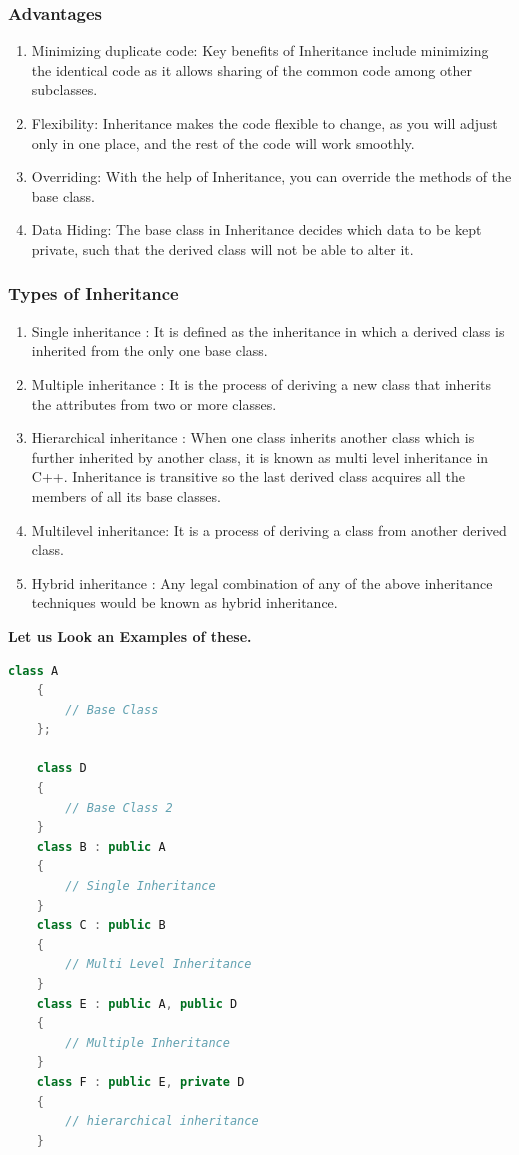 \documentclass[11pt]{article}
\begin{document}
\subsubsection{Advantages}
\begin{enumerate}
	\item Minimizing duplicate code: Key benefits of Inheritance include minimizing the identical code as it allows sharing of the common code among other subclasses.

	\item Flexibility: Inheritance makes the code flexible to change, as you will adjust only in one place, and the rest of the code will work smoothly.

	\item Overriding: With the help of Inheritance, you can override the methods of the base class.

	\item Data Hiding: The base class in Inheritance decides which data to be kept private, such that the derived class will not be able to alter it.
\end{enumerate}

\subsubsection{Types of Inheritance}

\begin{enumerate}
	\item Single inheritance :
	      It is defined as the inheritance in which a derived class is inherited from the only one base class.
	\item Multiple inheritance : It is the process of deriving a new class that inherits the attributes from two or more classes.
	\item Hierarchical inheritance : When one class inherits another class which is further inherited by another class, it is known as multi level inheritance in C++. Inheritance is transitive so the last derived class acquires all the members of all its base classes.
	\item Multilevel inheritance: It is a process of deriving a class from another derived class.
	\item Hybrid inheritance : Any legal combination of any of the above inheritance techniques would be known as hybrid inheritance.
\end{enumerate}

\textbf{Let us Look an Examples of these.}
\begin{lstlisting}[language = C++]
	class A
	{
		// Base Class
	};

	class D
	{
		// Base Class 2
	}
	class B : public A
	{
		// Single Inheritance
	}
	class C : public B
	{
		// Multi Level Inheritance
	}
	class E : public A, public D
	{
		// Multiple Inheritance
	}
	class F : public E, private D
	{
		// hierarchical inheritance
	}
\end{lstlisting}
\end{document}
